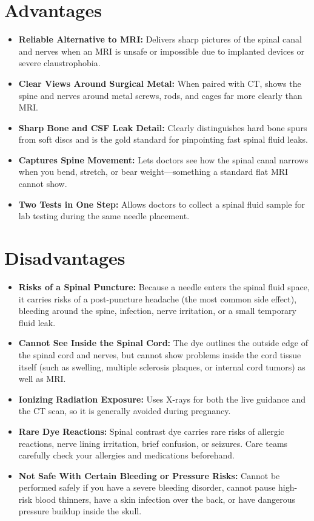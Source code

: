 \section{Advantages}
\begin{itemize}
    \item \textbf{Reliable Alternative to MRI:} Delivers sharp pictures of the spinal canal and nerves when an MRI is unsafe or impossible due to implanted devices or severe claustrophobia.
    \item \textbf{Clear Views Around Surgical Metal:} When paired with CT, shows the spine and nerves around metal screws, rods, and cages far more clearly than MRI.
    \item \textbf{Sharp Bone and CSF Leak Detail:} Clearly distinguishes hard bone spurs from soft discs and is the gold standard for pinpointing fast spinal fluid leaks.
    \item \textbf{Captures Spine Movement:} Lets doctors see how the spinal canal narrows when you bend, stretch, or bear weight---something a standard flat MRI cannot show.
    \item \textbf{Two Tests in One Step:} Allows doctors to collect a spinal fluid sample for lab testing during the same needle placement.
\end{itemize}

\section{Disadvantages}
\begin{itemize}
    \item \textbf{Risks of a Spinal Puncture:} Because a needle enters the spinal fluid space, it carries risks of a post-puncture headache (the most common side effect), bleeding around the spine, infection, nerve irritation, or a small temporary fluid leak.
    \item \textbf{Cannot See Inside the Spinal Cord:} The dye outlines the outside edge of the spinal cord and nerves, but cannot show problems inside the cord tissue itself (such as swelling, multiple sclerosis plaques, or internal cord tumors) as well as MRI.
    \item \textbf{Ionizing Radiation Exposure:} Uses X-rays for both the live guidance and the CT scan, so it is generally avoided during pregnancy.
    \item \textbf{Rare Dye Reactions:} Spinal contrast dye carries rare risks of allergic reactions, nerve lining irritation, brief confusion, or seizures. Care teams carefully check your allergies and medications beforehand.
    \item \textbf{Not Safe With Certain Bleeding or Pressure Risks:} Cannot be performed safely if you have a severe bleeding disorder, cannot pause high-risk blood thinners, have a skin infection over the back, or have dangerous pressure buildup inside the skull.
\end{itemize}

